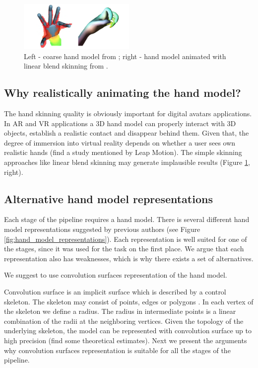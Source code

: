 \begin{figure}[h!] 
	\centering
	\hspace{-2em}
	\includegraphics[width=0.5\textwidth]{figures/coarse_hand_model_and_lbs}
	\caption{Left - coarse hand model  from \cite{tagliasacchi2015robust}; right - hand model animated with linear blend skinning from \cite{sharp2015accurate}.}
	\label{fig:coarse_hand_model_and_lbs}
\end{figure}


\subsection{Why realistically animating the hand model?}

The hand skinning quality is obviously important for digital avatars applications. In AR and VR applications a 3D hand model can properly interact with 3D objects, establish a realistic contact and disappear behind them. Given that, the degree of immersion into virtual reality depends on whether a user sees own realistic hands \textcolor{mygray}{(find a study mentioned by Leap Motion).} The simple skinning approaches like linear blend skinning may generate implausible results  (Figure \ref{fig:coarse_hand_model_and_lbs}, right).

\subsection{Alternative hand model representations}
Each stage of the pipeline requires a hand model. There is several different hand model representations suggested by previous authors (see Figure \ref{fig:hand_model_representations}). Each representation is well suited for one of the stages, since it was used for the task on the first place. We argue that each representation also has weaknesses, which is why there exists a set of alternatives.

We suggest to use convolution surfaces representation of the hand model. 

Convolution surface is an implicit surface which is described by a control skeleton. The skeleton may consist of points, edges or polygons \cite{bloomenthal1991convolution}. In each vertex of the skeleton we define a radius. The radius in intermediate points is a linear combination of the radii at the neighboring vertices. Given the topology of the underlying skeleton, the model can be represented with convolution surface up to high precision \textcolor{mygray}{(find some theoretical estimates).} Next we present the arguments why convolution surfaces representation is suitable for all the stages of the pipeline.


